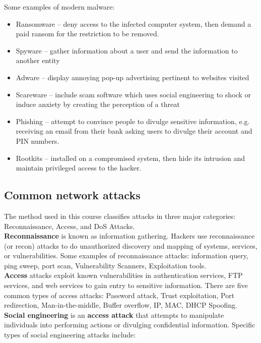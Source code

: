 Some examples of modern malware:

\begin{itemize}
\item Ransomware -- deny access to the infected computer system, then demand a paid ransom for the restriction to be removed.
\item Spyware -- gather information about a user and send the information to another entity
\item Adware -- display annoying pop-up advertising pertinent to websites visited
\item Scareware -- include scam software which uses social engineering to shock or induce anxiety by creating the perception of a threat
\item Phishing -- attempt to convince people to divulge sensitive information, e.g. receiving an email from their bank asking users to divulge their account and PIN numbers.
\item Rootkits -- installed on a compromised system, then hide its intrusion and maintain privileged access to the hacker.
\end{itemize}

\subsection{Common network attacks}

The method used in this course classifies attacks in three major categories: Reconnaissance, Access, and DoS Attacks.\\

\textbf{Reconnaissance} is known as information gathering. Hackers use reconnaissance (or recon) attacks to do unauthorized discovery and mapping of systems, services, or vulnerabilities. Some examples of reconnaissance attacks:  information query, ping sweep,  port scan,  Vulnerability Scanners,  Exploitation tools.\\

\textbf{Access} attacks exploit known vulnerabilities in authentication services, FTP services, and web services to gain entry to  sensitive information. There are five common types of access attacks: Password attack, Trust exploitation, Port redirection, Man-in-the-middle, Buffer overflow, IP, MAC, DHCP Spoofing.\\

\textbf{Social engineering} is an \textbf{access attack} that attempts to manipulate individuals into performing actions or divulging confidential information. Specific types of social engineering attacks include:

